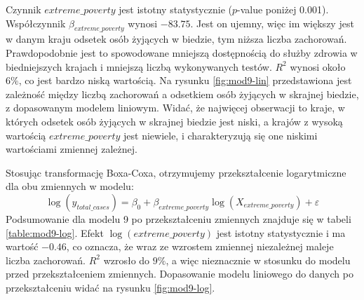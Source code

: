 \documentclass[12pt]{mwbk}
\theoremstyle{plain}
\theoremstyle{definition}
\theoremstyle{remark}
\begin{document}
 Czynnik $extreme\_poverty$ jest istotny statystycznie ($p$-value poniżej 0.001). \\Współczynnik $\beta_{extreme\_poverty}$ wynosi $-83.75$. Jest on ujemny, więc im większy jest w danym kraju odsetek osób żyjących w biedzie, tym niższa liczba zachorowań. Prawdopodobnie jest to spowodowane mniejszą dostępnością do służby zdrowia w biedniejszych krajach i mniejszą liczbą wykonywanych testów. $R^2$ wynosi około $6\%$, co jest bardzo niską wartością. Na rysunku \ref{fig:mod9-lin} przedstawiona jest zależność między liczbą zachorowań a odsetkiem osób żyjących w skrajnej biedzie, z dopasowanym modelem liniowym. Widać, że najwięcej obserwacji to kraje, w których odsetek osób żyjących w skrajnej biedzie jest niski, a krajów z wysoką wartością $extreme\_poverty$ jest niewiele, i charakteryzują się one niskimi wartościami zmiennej zależnej.

Stosując transformację Boxa-Coxa, otrzymujemy przekształcenie logarytmiczne dla obu zmiennych w modelu:
$$\log(y_{total\_cases})=\beta_0+\beta_{extreme\_poverty}\log(X_{extreme\_poverty})+\varepsilon$$
Podsumowanie dla modelu 9 po przekształceniu zmiennych znajduje się w tabeli \ref{table:mod9-log}. Efekt $\log(extreme\_poverty)$ jest istotny statystycznie i ma wartość $-0.46$, co oznacza, że wraz ze wzrostem zmiennej niezależnej maleje liczba zachorowań. $R^2$ wzrosło do $9\%$, a więc nieznacznie w stosunku do modelu przed przekształceniem zmiennych. Dopasowanie modelu liniowego do danych po przekształceniu widać na rysunku \ref{fig:mod9-log}.
\end{document}
